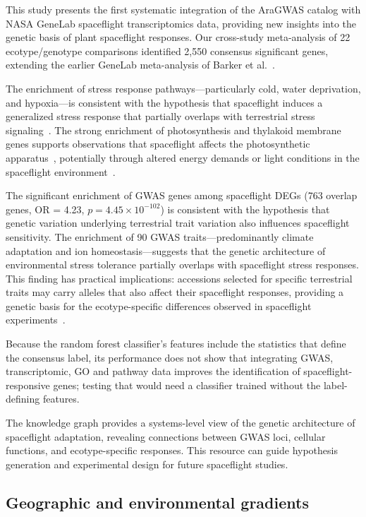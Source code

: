 \documentclass[sn-mathphys-num,Basic]{sn-jnl}
\begin{document}
This study presents the first systematic integration of the AraGWAS catalog with NASA GeneLab spaceflight transcriptomics data, providing new insights into the genetic basis of plant spaceflight responses. Our cross-study meta-analysis of 22 ecotype/genotype comparisons identified 2,550 consensus significant genes, extending the earlier GeneLab meta-analysis of Barker et al.~\cite{Barker2023}.

The enrichment of stress response pathways---particularly cold, water deprivation, and hypoxia---is consistent with the hypothesis that spaceflight induces a generalized stress response that partially overlaps with terrestrial stress signaling~\cite{Choi2019,Johnson2017}. The strong enrichment of photosynthesis and thylakoid membrane genes supports observations that spaceflight affects the photosynthetic apparatus~\cite{Olanrewaju2023}, potentially through altered energy demands or light conditions in the spaceflight environment~\cite{Zhou2024}.

The significant enrichment of GWAS genes among spaceflight DEGs (763 overlap genes, OR = 4.23, $p = 4.45 \times 10^{-102}$) is consistent with the hypothesis that genetic variation underlying terrestrial trait variation also influences spaceflight sensitivity. The enrichment of 90 GWAS traits---predominantly climate adaptation and ion homeostasis---suggests that the genetic architecture of environmental stress tolerance partially overlaps with spaceflight stress responses. This finding has practical implications: accessions selected for specific terrestrial traits may carry alleles that also affect their spaceflight responses, providing a genetic basis for the ecotype-specific differences observed in spaceflight experiments~\cite{Paul2017,Choi2019}.

Because the random forest classifier's features include the statistics that define the consensus label, its performance does not show that integrating GWAS, transcriptomic, GO and pathway data improves the identification of spaceflight-responsive genes; testing that would need a classifier trained without the label-defining features.

The knowledge graph provides a systems-level view of the genetic architecture of spaceflight adaptation, revealing connections between GWAS loci, cellular functions, and ecotype-specific responses. This resource can guide hypothesis generation and experimental design for future spaceflight studies.

\subsection*{Geographic and environmental gradients}
\end{document}
